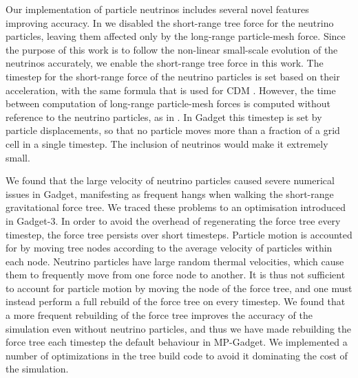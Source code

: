\documentclass[useAMS, usenatbib]{mnras}
\begin{document}
Our implementation of particle neutrinos includes several novel features improving accuracy.
In \cite{Bird_2012} we disabled the short-range tree force for the neutrino particles, leaving them affected only by the long-range particle-mesh force. Since the purpose of this work is to follow the non-linear small-scale evolution of the neutrinos accurately, we enable the short-range tree force in this work. The timestep for the short-range force of the neutrino particles is set based on their acceleration, with the same formula that is used for CDM \citep{Springel_2005}. However, the time between computation of long-range particle-mesh forces is computed without reference to the neutrino particles, as in \cite{Viel_2010, Bird_2012}. In Gadget this timestep is set by particle displacements, so that no particle moves more than a fraction of a grid cell in a single timestep. The inclusion of neutrinos would make it extremely small.

We found that the large velocity of neutrino particles caused severe numerical issues in Gadget, manifesting as frequent hangs when walking the short-range gravitational force tree. We traced these problems to an optimisation introduced in Gadget-3. In order to avoid the overhead of regenerating the force tree every timestep, the force tree persists over short timesteps. Particle motion is accounted for by moving tree nodes according to the average velocity of particles within each node. Neutrino particles have large random thermal velocities, which cause them to frequently move from one force node to another. It is thus not sufficient to account for particle motion by moving the node of the force tree, and one must instead perform a full rebuild of the force tree on every timestep. We found that a more frequent rebuilding of the force tree improves the accuracy of the simulation even without neutrino particles, and thus we have made rebuilding the force tree each timestep the default behaviour in MP-Gadget. We implemented a number of optimizations in the tree build code to avoid it dominating the cost of the simulation.
\end{document}
